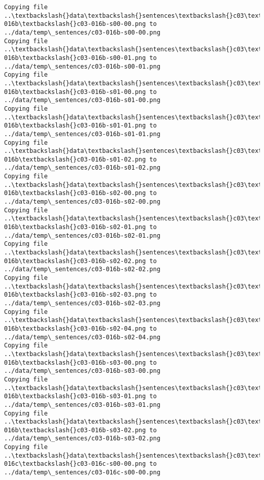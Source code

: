 \documentclass[11pt]{article}
\begin{document}
\begin{Verbatim}[commandchars=\\\{\}]
Copying file ..\textbackslash{}data\textbackslash{}sentences\textbackslash{}c03\textbackslash{}c03-016b\textbackslash{}c03-016b-s00-00.png to
../data/temp\_sentences/c03-016b-s00-00.png
Copying file ..\textbackslash{}data\textbackslash{}sentences\textbackslash{}c03\textbackslash{}c03-016b\textbackslash{}c03-016b-s00-01.png to
../data/temp\_sentences/c03-016b-s00-01.png
Copying file ..\textbackslash{}data\textbackslash{}sentences\textbackslash{}c03\textbackslash{}c03-016b\textbackslash{}c03-016b-s01-00.png to
../data/temp\_sentences/c03-016b-s01-00.png
Copying file ..\textbackslash{}data\textbackslash{}sentences\textbackslash{}c03\textbackslash{}c03-016b\textbackslash{}c03-016b-s01-01.png to
../data/temp\_sentences/c03-016b-s01-01.png
Copying file ..\textbackslash{}data\textbackslash{}sentences\textbackslash{}c03\textbackslash{}c03-016b\textbackslash{}c03-016b-s01-02.png to
../data/temp\_sentences/c03-016b-s01-02.png
Copying file ..\textbackslash{}data\textbackslash{}sentences\textbackslash{}c03\textbackslash{}c03-016b\textbackslash{}c03-016b-s02-00.png to
../data/temp\_sentences/c03-016b-s02-00.png
Copying file ..\textbackslash{}data\textbackslash{}sentences\textbackslash{}c03\textbackslash{}c03-016b\textbackslash{}c03-016b-s02-01.png to
../data/temp\_sentences/c03-016b-s02-01.png
Copying file ..\textbackslash{}data\textbackslash{}sentences\textbackslash{}c03\textbackslash{}c03-016b\textbackslash{}c03-016b-s02-02.png to
../data/temp\_sentences/c03-016b-s02-02.png
Copying file ..\textbackslash{}data\textbackslash{}sentences\textbackslash{}c03\textbackslash{}c03-016b\textbackslash{}c03-016b-s02-03.png to
../data/temp\_sentences/c03-016b-s02-03.png
Copying file ..\textbackslash{}data\textbackslash{}sentences\textbackslash{}c03\textbackslash{}c03-016b\textbackslash{}c03-016b-s02-04.png to
../data/temp\_sentences/c03-016b-s02-04.png
Copying file ..\textbackslash{}data\textbackslash{}sentences\textbackslash{}c03\textbackslash{}c03-016b\textbackslash{}c03-016b-s03-00.png to
../data/temp\_sentences/c03-016b-s03-00.png
Copying file ..\textbackslash{}data\textbackslash{}sentences\textbackslash{}c03\textbackslash{}c03-016b\textbackslash{}c03-016b-s03-01.png to
../data/temp\_sentences/c03-016b-s03-01.png
Copying file ..\textbackslash{}data\textbackslash{}sentences\textbackslash{}c03\textbackslash{}c03-016b\textbackslash{}c03-016b-s03-02.png to
../data/temp\_sentences/c03-016b-s03-02.png
Copying file ..\textbackslash{}data\textbackslash{}sentences\textbackslash{}c03\textbackslash{}c03-016c\textbackslash{}c03-016c-s00-00.png to
../data/temp\_sentences/c03-016c-s00-00.png

\end{Verbatim}
\end{document}
